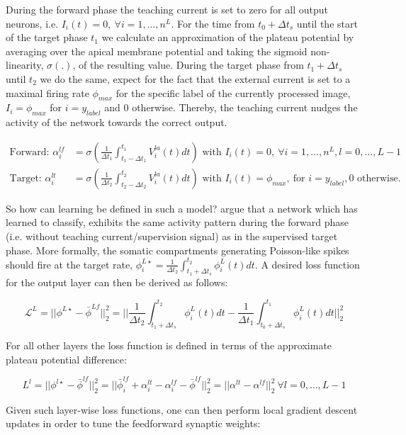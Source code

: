 \documentclass[colorinlistoftodos]{article}
\theoremstyle{definition}
\begin{document}
During the forward phase the teaching current is set to zero for all output neurons, i.e. $I_i(t) = 0, \ \forall i=1,\dots, n^L$. For the time from $t_0 + \Delta t_s$ until the start of the target phase $t_1$ we calculate an approximation of the plateau potential by averaging over the apical membrane potential and taking the sigmoid non-linearity, $\sigma(.)$, of the resulting value.
During the target phase from $t_1 + \Delta t_s$ until $t_2$ we do the same, expect for the fact that the external current is set to a maximal firing rate $\phi_{max}$ for the specific label of the currently processed image, $I_i = \phi_{max}$ for $i = y_{label}$ and 0 otherwise. Thereby, the teaching current nudges the activity of the network towards the correct output.
	
\begin{align*}
	\text{Forward:  } \alpha_i^{lf} &= \sigma\left(\frac{1}{\Delta t_1} \int_{t_1 - \Delta t_1}^{t_1} V_i^{la}(t)dt\right) \text{  with  } I_i(t) = 0, \ \forall i=1,\dots, n^L, l=0,\dots, L-1 \\
	\text{Target:  } \alpha_i^{lt} &= \sigma\left(\frac{1}{\Delta t_2} \int_{t_2 - \Delta t_2}^{t_2} V_i^{la}(t)dt\right) \text{  with  } I_i(t) = \phi_{max}, \ \text{for  } i = y_{label}, 0 \text{  otherwise.}
\end{align*}

So how can learning be defined in such a model? \citet{guerguiev2017} argue that a network which has learned to classify, exhibits the same activity pattern during the forward phase (i.e. without teaching current/supervision signal) as in the supervised target phase. More formally, the somatic compartments generating Poisson-like spikes should fire at the target rate, $\phi_i^{L\star} = \frac{1}{\Delta t_2} \int_{t_1 + \Delta t_s}^{t_2} \phi_i^L(t)dt$. A desired loss function for the output layer can then be derived as follows:

$$\mathcal{L}^L = ||\phi^{L\star} - \bar{\phi}^{Lf}||_2^2 = ||\frac{1}{\Delta t_2} \int_{t_1 + \Delta t_s}^{t_2} \phi_i^L(t)dt - \frac{1}{\Delta t_1} \int_{t_0 + \Delta t_s}^{t_1} \phi_i^L(t)dt||_2^2$$

For all other layers the loss function is defined in terms of the approximate plateau potential difference:

$$L^l = ||\phi^{l\star} - \bar{\phi}^{lf}||_2^2 = ||\bar{\phi}_i^{lf} + \alpha_i^{lt} - \alpha_i^{lf} - \bar{\phi}^{lf}||_2^2 = ||\alpha^{lt} - \alpha^{lf}||_2^2 \ \forall l=0, \dots, L-1$$

Given such layer-wise loss functions, one can then perform local gradient descent updates in order to tune the feedforward synaptic weights:
\end{document}
